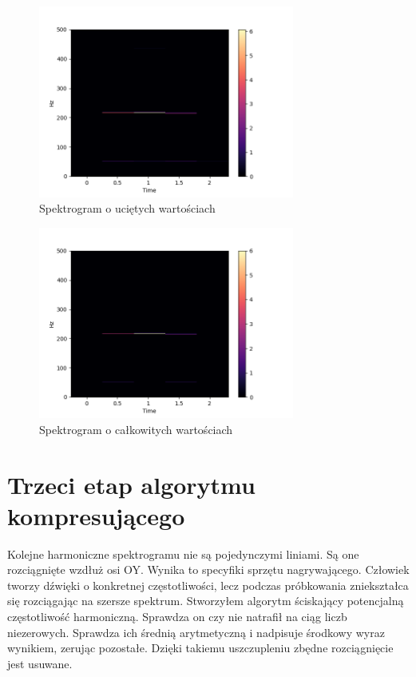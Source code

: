 \documentclass[a4paper,12pt]{extarticle}
\begin{document}
\clearpage

\begin{figure}[h!]
\centering
\includegraphics[width=0.75\textwidth]{spec-trimmed}
\caption{Spektrogram o uciętych wartościach}
\end{figure}

\begin{figure}[h!]
\centering
\includegraphics[width=0.75\textwidth]{spec-uint8}
\caption{Spektrogram o całkowitych wartościach}
\end{figure}

\clearpage

\section*{Trzeci etap algorytmu kompresującego}

Kolejne harmoniczne spektrogramu nie są pojedynczymi liniami. Są one rozciągnięte wzdłuż osi OY. Wynika to specyfiki sprzętu nagrywającego. Człowiek tworzy dźwięki o konkretnej częstotliwości, lecz podczas próbkowania zniekształca się rozciągając na szersze spektrum. Stworzyłem algorytm ściskający potencjalną częstotliwość harmoniczną. Sprawdza on czy nie natrafił na ciąg liczb niezerowych. Sprawdza ich średnią arytmetyczną i nadpisuje środkowy wyraz wynikiem, zerując pozostałe. Dzięki takiemu uszczupleniu zbędne rozciągnięcie jest usuwane.
\end{document}
